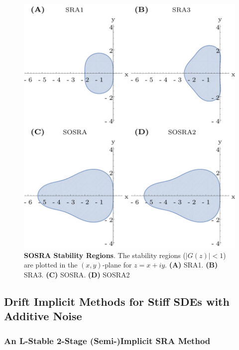 \documentclass{article}
\begin{document}
\begin{center}
	\begin{figure}
		\begin{centering}
			\includegraphics[scale=0.5]{paper_figures/SOSRA_stability}
			\par\end{centering}
		\caption{\textbf{SOSRA Stability Regions}. The stability regions ($\left|G(z)\right|<1$)
			are plotted in the $(x,y)$-plane for $z=x+iy$. \textbf{(A)} SRA1.
			\textbf{(B) }SRA3. \textbf{(C) }SOSRA. \textbf{(D)} SOSRA2\label{fig:SOSRA-Stability-Regions.}}
	\end{figure}
	\par\end{center}

\subsection{Drift Implicit Methods for Stiff SDEs with Additive Noise}

\subsubsection{An L-Stable 2-Stage (Semi-)Implicit SRA Method}
\end{document}
